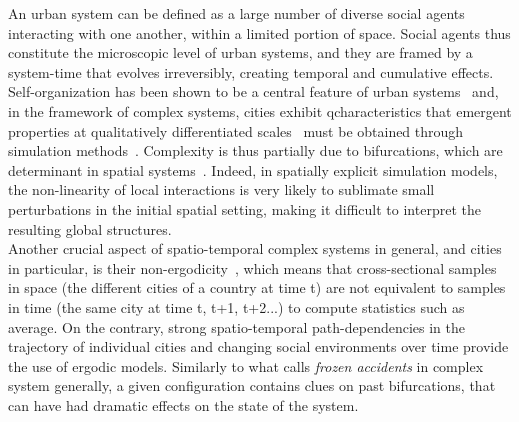\documentclass[Royal,sageh,times]{sagej}
\begin{document}
An urban system can be defined as a large number of diverse social agents interacting with one another, within a limited portion of space. Social agents thus constitute the microscopic level of urban systems, and they are framed by a system-time that evolves irreversibly, creating temporal and cumulative effects. Self-organization has been shown to be a central feature of urban systems~\citep{AllenSanglier1981,saint1989villes, Portugali2000} and, in the framework of complex systems, cities exhibit qcharacteristics that emergent properties at qualitatively differentiated scales~\citep{pumain2006hierarchy, AzizAlaouiBertelle2009} must be obtained through simulation methods~\citep{Wu2002, Batty2007}. Complexity is thus partially due to bifurcations, which are determinant in spatial systems~\citep{Wilson1981, Wilson2002}. Indeed, in spatially explicit simulation models, the non-linearity of local interactions is very likely to sublimate small perturbations in the initial spatial setting, making it difficult to interpret the resulting global structures. \\
Another crucial aspect of spatio-temporal complex systems in general, and cities in particular, is their non-ergodicity~\citep{pumain2012urban}, which means that cross-sectional samples in space (the different cities of a country at time t) are not equivalent to samples in time (the same city at time t, t+1, t+2...) to compute statistics such as average. On the contrary, strong spatio-temporal path-dependencies in the trajectory of individual cities and changing social environments over time provide the use of ergodic models. Similarly to what \citet{gell1995quark} calls \emph{frozen accidents} in complex system generally, a given configuration contains clues on past bifurcations, that can have had dramatic effects on the state of the system. \\
\end{document}
